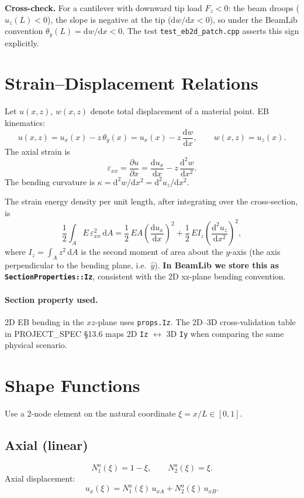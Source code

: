 \documentclass[11pt,a4paper]{article}
\newcommand{\dd}{\mathrm{d}}
\begin{document}
\textbf{Cross-check.} For a cantilever with downward tip load $F_z < 0$: the beam droops ($u_z(L) < 0$), the slope is negative at the tip ($\dd w/\dd x < 0$), so under the BeamLib convention $\theta_y(L) = \dd w/\dd x < 0$. The test \texttt{test\_eb2d\_patch.cpp} asserts this sign explicitly.

\section{Strain--Displacement Relations}

Let $u(x,z)$, $w(x,z)$ denote total displacement of a material point. EB kinematics:
\[
u(x,z) = u_x(x) - z\,\theta_y(x) = u_x(x) - z\,\frac{\dd w}{\dd x}, \qquad w(x,z) = u_z(x).
\]
The axial strain is
\[
\varepsilon_{xx} = \frac{\partial u}{\partial x} = \frac{\dd u_x}{\dd x} - z\,\frac{\dd^2 w}{\dd x^2}.
\]
The bending curvature is $\kappa = \dd^2 w / \dd x^2 = \dd^2 u_z / \dd x^2$.

The strain energy density per unit length, after integrating over the cross-section, is
\[
\frac{1}{2}\!\int_A E\,\varepsilon_{xx}^2 \,\dd A
= \frac{1}{2}\,E A \!\left(\frac{\dd u_x}{\dd x}\right)^2
+ \frac{1}{2}\,E I_z \!\left(\frac{\dd^2 u_z}{\dd x^2}\right)^2,
\]
where $I_z = \int_A z^2\,\dd A$ is the second moment of area about the $y$-axis (the axis perpendicular to the bending plane, i.e.\ $\hat{y}$). \textbf{In BeamLib we store this as \texttt{SectionProperties::Iz}}, consistent with the 2D xz-plane bending convention.

\paragraph{Section property used.} 2D EB bending in the $xz$-plane uses \texttt{props.Iz}. The 2D--3D cross-validation table in PROJECT\_SPEC \S 13.6 maps 2D \texttt{Iz} $\leftrightarrow$ 3D \texttt{Iy} when comparing the same physical scenario.

\section{Shape Functions}

Use a 2-node element on the natural coordinate $\xi = x / L \in [0, 1]$.

\subsection{Axial (linear)}

\[
N_1^a(\xi) = 1-\xi, \qquad N_2^a(\xi) = \xi.
\]
Axial displacement:
\[
u_x(\xi) = N_1^a(\xi)\,u_{xA} + N_2^a(\xi)\,u_{xB}.
\]
\end{document}
